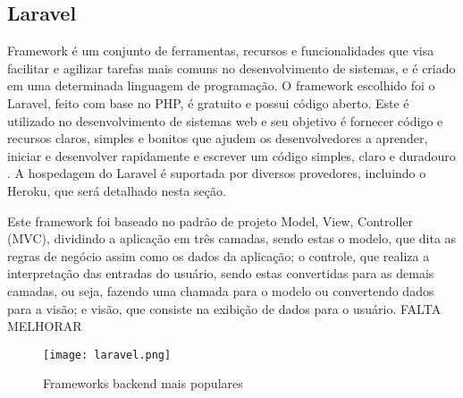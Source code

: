 \subsection{Laravel}
Framework é um conjunto de ferramentas, recursos e funcionalidades que visa facilitar e agilizar tarefas mais comuns no desenvolvimento de sistemas, e é criado em uma determinada linguagem de programação. O framework escolhido foi o Laravel, feito com base no PHP, é gratuito e possui código aberto. Este é utilizado no desenvolvimento de sistemas web e seu objetivo é fornecer código e recursos claros, simples e bonitos que ajudem os desenvolvedores a aprender, iniciar e desenvolver rapidamente e escrever um código simples, claro e duradouro \cite{STAUFFER}. A hospedagem do Laravel é suportada por diversos provedores, incluindo o Heroku, que será detalhado nesta seção. 

Este framework foi baseado no padrão de projeto Model, View, Controller (MVC), dividindo a aplicação em três camadas, sendo estas o modelo, que dita as regras de negócio assim como os dados da aplicação; o controle, que realiza a interpretação das entradas do usuário, sendo estas convertidas para as demais camadas, ou seja, fazendo uma chamada para o modelo ou convertendo dados para a visão; e visão, que consiste na exibição de dados para o usuário. 
FALTA MELHORAR
\begin{figure}[h]
    \caption{\label{framework_popular}Frameworks backend mais populares}
    \vspace{5pt}
    \centering
    \texttt{[image: laravel.png]}
    \vspace{5pt}
\end{figure}

